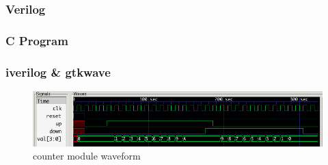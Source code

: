\documentclass{article}
\begin{document}
    \subsubsection{Verilog}
      
      

      
      

      
      

      
      

      

    \subsubsection{C Program}
      

      

      

      

    \subsubsection{iverilog \& gtkwave}
      \begin{figure}[H]
        \centering
        \includegraphics[width=0.75\linewidth]{figures/gtkwave/counter_gtkwave.png}
        \caption{counter module waveform}
        \label{fig:counter_gtkwave}
      \end{figure}
\end{document}
